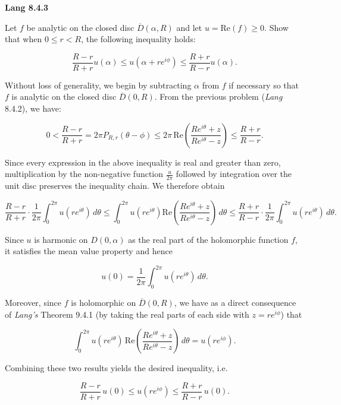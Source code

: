 \textbf{Lang 8.4.3}

Let $f$ be analytic on the closed disc $\overline{D}(\alpha, R)$ and let $u = \text{Re}(f) \ge 0$. Show that when 
$0 \le r < R$, the following inequality holds:

$$
\frac{R - r}{R + r} u(\alpha) \le u(\alpha + r e^{i \phi}) \le \frac{R + r}{R - r} u(\alpha).
$$

\begin{solution}
  Without loss of generality, we begin by subtracting $\alpha$ from $f$ if necessary so that $f$ is analytic on the 
  closed disc $\overline{D}(0, R)$. From the previous problem (\textit{Lang} 8.4.2), we have:

  $$
  0 < \frac{R - r}{R + r} 
    = 2 \pi P_{R, r}(\theta - \phi)
    \le 2 \pi \, \text{Re} \left(\frac{R e^{i\theta} + z}{{R e^{i\theta} - z}}\right)
    \le \frac{R + r}{R - r}.
  $$

  Since every expression in the above inequality is real and greater than zero, multiplication by the non-negative 
  function $\frac{u}{2 \pi}$ followed by integration over the unit disc preserves the inequality chain. We therefore 
  obtain

  $$
  \frac{R - r}{R + r} \cdot \frac{1}{2 \pi} \int_0^{2 \pi} u(r e^{i \theta}) \, d\theta 
    \le \int_0^{2 \pi} u(r e^{i \theta}) \text{Re} \left(\frac{R e^{i\theta} + z}{{R e^{i\theta} - z}}\right) \, d\theta
    \le \frac{R + r}{R - r} \cdot \frac{1}{2 \pi} \int_0^{2 \pi} u(r e^{i \theta}) \, d\theta.
  $$

  Since $u$ is harmonic on $D(0, \alpha)$ as the real part of the holomorphic function $f$, it satisfies the mean value 
  property and hence

  $$
  u(0) = \frac{1}{2 \pi} \int_0^{2 \pi} u(r e^{i \theta}) \, d\theta.
  $$

  Moreover, since $f$ is holomorphic on $\overline{D}(0, R)$, we have as a direct consequence of \textit{Lang's} 
  Theorem 9.4.1 (by taking the real parts of each side with $z = r e^{i \phi}$) that

  $$
  \int_0^{2 \pi} u(r e^{i \theta}) \, \text{Re} \left(\frac{R e^{i\theta} + z}{{R e^{i\theta} - z}}\right) \, d\theta
    = u(r e^{i \phi}).
  $$

  Combining these two results yields the desired inequality, i.e.

  $$
  \frac{R - r}{R + r} \, u(0) \le u(r e^{i \phi}) \le \frac{R + r}{R - r} \, u(0).
  $$
  \ \\
\end{solution}
